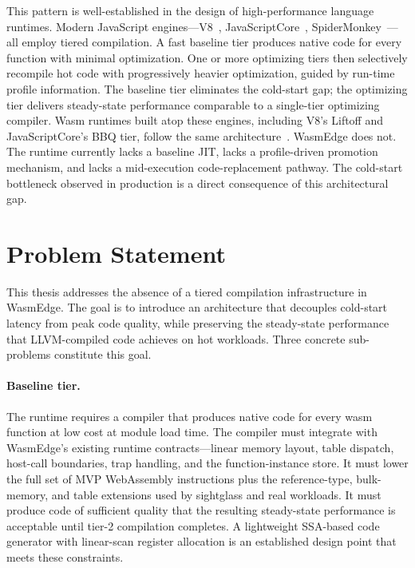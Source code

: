 This pattern is well-established in the design of high-performance language runtimes. Modern JavaScript engines---V8~\cite{v8-wasm}, JavaScriptCore~\cite{webkit-wasm}, SpiderMonkey~\cite{firefox-tiering}---all employ tiered compilation. A fast baseline tier produces native code for every function with minimal optimization. One or more optimizing tiers then selectively recompile hot code with progressively heavier optimization, guided by run-time profile information. The baseline tier eliminates the cold-start gap; the optimizing tier delivers steady-state performance comparable to a single-tier optimizing compiler. Wasm runtimes built atop these engines, including V8's Liftoff and JavaScriptCore's BBQ tier, follow the same architecture~\cite{v8-wasm,webkit-wasm}. WasmEdge does not. The runtime currently lacks a baseline JIT, lacks a profile-driven promotion mechanism, and lacks a mid-execution code-replacement pathway. The cold-start bottleneck observed in production is a direct consequence of this architectural gap.

\section{Problem Statement}
\label{sec:intro:problem}

This thesis addresses the absence of a tiered compilation infrastructure in WasmEdge. The goal is to introduce an architecture that decouples cold-start latency from peak code quality, while preserving the steady-state performance that LLVM-compiled code achieves on hot workloads. Three concrete sub-problems constitute this goal.

\paragraph{Baseline tier.} The runtime requires a compiler that produces native code for every wasm function at low cost at module load time. The compiler must integrate with WasmEdge's existing runtime contracts---linear memory layout, table dispatch, host-call boundaries, trap handling, and the function-instance store. It must lower the full set of MVP WebAssembly instructions plus the reference-type, bulk-memory, and table extensions used by sightglass and real workloads. It must produce code of sufficient quality that the resulting steady-state performance is acceptable until tier-2 compilation completes. A lightweight SSA-based code generator with linear-scan register allocation is an established design point that meets these constraints.

